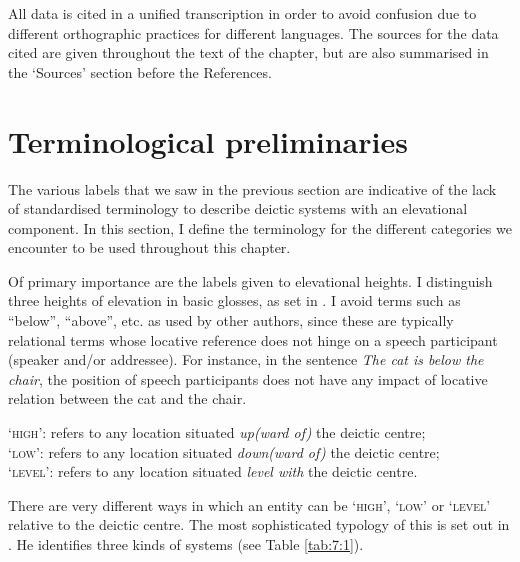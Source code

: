 All data is cited in a unified transcription in order to avoid confusion due to different orthographic practices for different languages. The sources for the data cited are given throughout the text of the chapter, but are also summarised in the `Sources' section before the References. 

\section{Terminological preliminaries}\label{sec:7:2}
The various labels that we saw in the previous section are indicative of the lack of standardised terminology to describe deictic systems with an elevational component. In this section, I define the terminology for the different categories we encounter to be used throughout this chapter. 

Of primary importance are the labels given to elevational heights. I distinguish three heights of elevation in basic glosses, as set in . I avoid terms such as ``below'', ``above'', etc. as used by other authors, since these are typically relational terms whose locative reference does not hinge on a speech participant (speaker and/or addressee). For instance, in the sentence \textit{The cat is below the chair}, the position of speech participants does not have any impact of locative relation between the cat and the chair. 




\ea \label{ex:7:1}
`\textsc{high}':   refers to any location situated \textit{up(ward of)} the deictic centre;\\
`\textsc{low}':   refers to any location situated \textit{down(ward of)} the deictic centre;\\
`\textsc{level}':  refers to any location situated \textit{level with} the deictic centre.\\ 
\z


There are very different ways in which an entity can be `\textsc{high}', `\textsc{low}' or `\textsc{level}' relative to the deictic centre. The most sophisticated typology of this is set out in \citet{Burenhult2008}. He identifies three kinds of systems \citep[110-111]{Burenhult2008} (see Table \ref{tab:7:1}).



